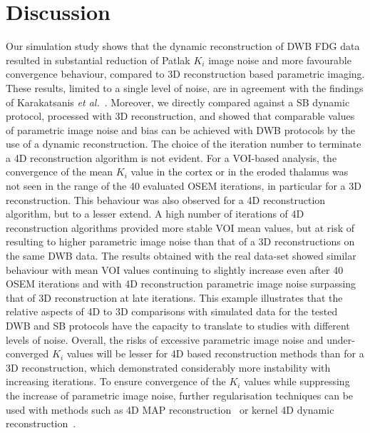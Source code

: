 \section{Discussion}
Our simulation study shows that the dynamic reconstruction of DWB FDG data resulted in substantial reduction of Patlak $K_i$ image noise and more favourable convergence behaviour, compared to 3D reconstruction based parametric imaging. These results, limited to a single level of noise, are in agreement with the findings of Karakatsanis \textit{et al.}~\cite{Karakatsanis2016a}. 
Moreover, we directly compared against a SB dynamic protocol, processed with 3D reconstruction, and showed that comparable values of parametric image noise and bias can be achieved with DWB protocols by the use of a dynamic reconstruction.
The choice of the iteration number to terminate a 4D reconstruction algorithm is not evident.
For a VOI-based analysis, the convergence of the mean $K_i$ value in the cortex or in the eroded thalamus was not seen in the range of the 40 evaluated OSEM iterations, in particular for a 3D reconstruction. This behaviour was also observed for a 4D reconstruction algorithm, but to a lesser extend. A high number of iterations of 4D reconstruction algorithms provided more stable VOI mean values, but at risk of resulting to higher parametric image noise than that of a 3D reconstructions on the same DWB data. 
The results obtained with the real data-set showed similar behaviour with mean VOI values continuing to slightly increase even after 40 OSEM iterations and with 4D reconstruction parametric image noise surpassing that of 3D reconstruction at late iterations.
This example illustrates that the relative aspects of 4D to 3D comparisons with simulated data for the tested DWB and SB protocols have the capacity to translate to studies with different levels of noise. %
Overall, the risks of excessive parametric image noise and under-converged $K_i$ values will be lesser for 4D based reconstruction methods than for a 3D reconstruction, which demonstrated considerably more instability with increasing iterations. To ensure convergence of the $K_i$ values while suppressing the increase of parametric image noise, further regularisation techniques can be used with methods such as 4D MAP reconstruction~\cite{Reader2014,Wang2008} or kernel 4D dynamic reconstruction~\cite{Novosad2016b,Gong2018}.

